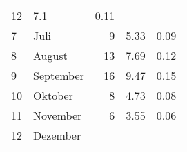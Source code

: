 \begin{longtable}{lXrrr}
       \num{12} &
       \num[round-mode=places,round-precision=2]{7,1} &
         \num[round-mode=places,round-precision=2]{0,11} \\

     7 &
     \multicolumn{1}{X}{ Juli   } &


       \num{9} &
       \num[round-mode=places,round-precision=2]{5,33} &
         \num[round-mode=places,round-precision=2]{0,09} \\

     8 &
     \multicolumn{1}{X}{ August   } &


       \num{13} &
       \num[round-mode=places,round-precision=2]{7,69} &
         \num[round-mode=places,round-precision=2]{0,12} \\

     9 &
     \multicolumn{1}{X}{ September   } &


       \num{16} &
       \num[round-mode=places,round-precision=2]{9,47} &
         \num[round-mode=places,round-precision=2]{0,15} \\

     10 &
     \multicolumn{1}{X}{ Oktober   } &


       \num{8} &
       \num[round-mode=places,round-precision=2]{4,73} &
         \num[round-mode=places,round-precision=2]{0,08} \\

     11 &
     \multicolumn{1}{X}{ November   } &


       \num{6} &
       \num[round-mode=places,round-precision=2]{3,55} &
         \num[round-mode=places,round-precision=2]{0,06} \\

     12 &
     \multicolumn{1}{X}{ Dezember   } &



\end{longtable}
